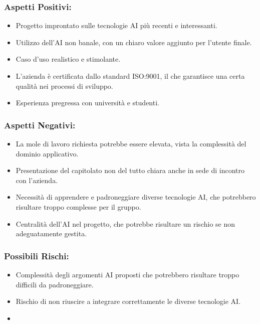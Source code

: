 \documentclass[a4paper,12pt]{article}
\begin{document}
\subsubsection*{Aspetti Positivi:}
\begin{itemize}
    \item Progetto improntato sulle tecnologie AI più recenti e interessanti.
    \item Utilizzo dell'AI non banale, con un chiaro valore aggiunto per l'utente finale.
    \item Caso d'uso realistico e stimolante.
    \item L'azienda è certificata dallo standard ISO:9001, il che garantisce una certa qualità nei processi di sviluppo.
    \item Esperienza pregressa con università e studenti.
\end{itemize}

\subsubsection*{Aspetti Negativi:}
\begin{itemize}
    \item La mole di lavoro richiesta potrebbe essere elevata, vista la complessità del dominio applicativo.
    \item Presentazione del capitolato non del tutto chiara anche in sede di incontro con l'azienda.
    \item Necessità di apprendere e padroneggiare diverse tecnologie AI, che potrebbero risultare troppo complesse per il gruppo.
    \item Centralità dell'AI nel progetto, che potrebbe risultare un rischio se non adeguatamente gestita.
\end{itemize}

\subsubsection*{Possibili Rischi:}
\begin{itemize}
    \item Complessità degli argomenti AI proposti che potrebbero risultare troppo difficili da padroneggiare.
    \item Rischio di non riuscire a integrare correttamente le diverse tecnologie AI.
    \item 
\end{itemize}
\end{document}
